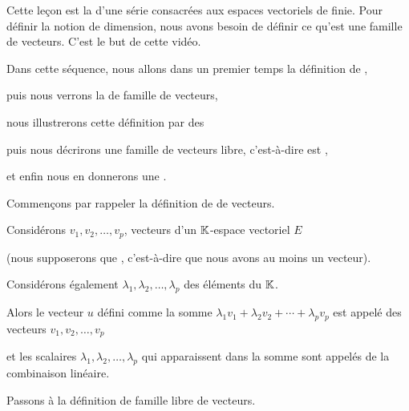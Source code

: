 






\debuttexte


\diapo

\change
Cette leçon est la  d'une série consacrées aux espaces vectoriels de  finie. 
Pour définir la notion de dimension, nous avons besoin  de définir  
ce qu'est une famille  de vecteurs. C'est le but de cette vidéo. 

\change
Dans cette séquence, nous allons dans un premier temps  la définition de ,

\change
puis nous verrons la  de famille  de vecteurs,

\change
nous illustrerons cette définition par des  

\change
puis nous décrirons  une famille de vecteurs  libre, c'est-à-dire est ,

\change 
et enfin nous en donnerons une .


\diapo
Commen\c{c}ons par rappeler la définition de  de vecteurs.


\change
Considérons  $v_1, v_2, \ldots, v_p$,   vecteurs d'un $\mathbb{K}$-espace vectoriel $E$ 

\change
(nous supposerons que , c'est-à-dire que nous avons au moins un vecteur). 

\change
Considérons également
  $\lambda_1, \lambda_2, \ldots,  \lambda_p$ des éléments du  $\mathbb{K}$.
  
\change
 Alors le vecteur $u$ défini comme la somme
 $\lambda_1 v_1+\lambda_2v_2+ \cdots + \lambda_pv_p$
 est appelé  des vecteurs $v_1, v_2, \ldots, v_p$
 
 \change
 et les scalaires $\lambda_1, \lambda_2, \ldots , \lambda_p$ qui apparaissent dans la somme
 sont appelés  de la combinaison linéaire. 


\diapo
Passons à la définition de famille libre de vecteurs.

